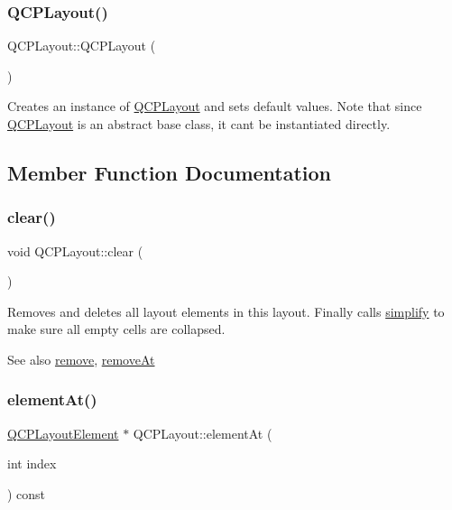 \subsubsection{\texorpdfstring{Q\+C\+P\+Layout()}{QCPLayout()}}
{\footnotesize\ttfamily Q\+C\+P\+Layout\+::\+Q\+C\+P\+Layout (\begin{DoxyParamCaption}{ }\end{DoxyParamCaption})\hspace{0.3cm}{\ttfamily [explicit]}}

Creates an instance of \hyperlink{classQCPLayout}{Q\+C\+P\+Layout} and sets default values. Note that since \hyperlink{classQCPLayout}{Q\+C\+P\+Layout} is an abstract base class, it can\textquotesingle{}t be instantiated directly. 

\subsection{Member Function Documentation}
\mbox{\label{classQCPLayout_a02883bdf2769b5b227f0232dba1ac4ee}} 
\subsubsection{\texorpdfstring{clear()}{clear()}}
{\footnotesize\ttfamily void Q\+C\+P\+Layout\+::clear (\begin{DoxyParamCaption}{ }\end{DoxyParamCaption})}

Removes and deletes all layout elements in this layout. Finally calls \hyperlink{classQCPLayout_a41e6ac049143866e8f8b4964efab01b2}{simplify} to make sure all empty cells are collapsed.

\begin{DoxySeeAlso}{See also}
\hyperlink{classQCPLayout_a6c58f537d8086f352576ab7c5b15d0bc}{remove}, \hyperlink{classQCPLayout_a2403f684fee3ce47132faaeed00bb066}{remove\+At} 
\end{DoxySeeAlso}
\mbox{\label{classQCPLayout_afa73ca7d859f8a3ee5c73c9b353d2a56}} 
\subsubsection{\texorpdfstring{element\+At()}{elementAt()}}
{\footnotesize\ttfamily \hyperlink{classQCPLayoutElement}{Q\+C\+P\+Layout\+Element} $\ast$ Q\+C\+P\+Layout\+::element\+At (\begin{DoxyParamCaption}\item[{int}]{index }\end{DoxyParamCaption}) const\hspace{0.3cm}{\ttfamily [pure virtual]}}

